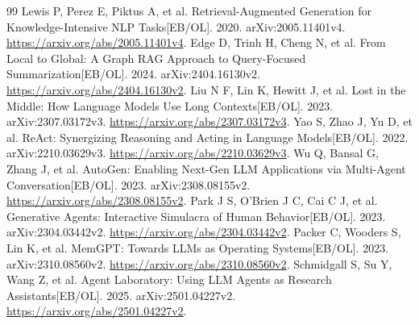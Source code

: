 \clearpage
\begingroup\small\raggedright
\begin{thebibliography}{99}
 Lewis P, Perez E, Piktus A, et al. Retrieval-Augmented Generation for Knowledge-Intensive NLP Tasks[EB/OL]. 2020. arXiv:2005.11401v4. \url{https://arxiv.org/abs/2005.11401v4}.
 Edge D, Trinh H, Cheng N, et al. From Local to Global: A Graph RAG Approach to Query-Focused Summarization[EB/OL]. 2024. arXiv:2404.16130v2. \url{https://arxiv.org/abs/2404.16130v2}.
 Liu N F, Lin K, Hewitt J, et al. Lost in the Middle: How Language Models Use Long Contexts[EB/OL]. 2023. arXiv:2307.03172v3. \url{https://arxiv.org/abs/2307.03172v3}.
 Yao S, Zhao J, Yu D, et al. ReAct: Synergizing Reasoning and Acting in Language Models[EB/OL]. 2022. arXiv:2210.03629v3. \url{https://arxiv.org/abs/2210.03629v3}.
 Wu Q, Bansal G, Zhang J, et al. AutoGen: Enabling Next-Gen LLM Applications via Multi-Agent Conversation[EB/OL]. 2023. arXiv:2308.08155v2. \url{https://arxiv.org/abs/2308.08155v2}.
 Park J S, O'Brien J C, Cai C J, et al. Generative Agents: Interactive Simulacra of Human Behavior[EB/OL]. 2023. arXiv:2304.03442v2. \url{https://arxiv.org/abs/2304.03442v2}.
 Packer C, Wooders S, Lin K, et al. MemGPT: Towards LLMs as Operating Systems[EB/OL]. 2023. arXiv:2310.08560v2. \url{https://arxiv.org/abs/2310.08560v2}.
 Schmidgall S, Su Y, Wang Z, et al. Agent Laboratory: Using LLM Agents as Research Assistants[EB/OL]. 2025. arXiv:2501.04227v2. \url{https://arxiv.org/abs/2501.04227v2}.
\end{thebibliography}
\endgroup
